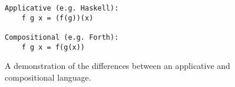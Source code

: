 \begin{figure}[!htb]
    \centering
    \begin{lstlisting}
Applicative (e.g. Haskell):
    f g x = (f(g))(x) 

Compositional (e.g. Forth):
    f g x = f(g(x))
\end{lstlisting}
    \caption{A demonstration of the differences between an applicative and compositional language.}
    \label{fig:applicative_vs_compositional_example}
\end{figure}

